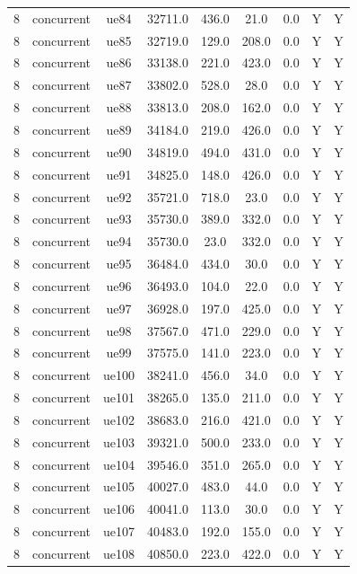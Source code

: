 \begin{table}[ht]
\begin{tabular}{|c|c|c|c|c|c|c|c|c|}
8 & concurrent & ue84 & 32711.0 & 436.0 & 21.0 & 0.0 & Y & Y \\
8 & concurrent & ue85 & 32719.0 & 129.0 & 208.0 & 0.0 & Y & Y \\
8 & concurrent & ue86 & 33138.0 & 221.0 & 423.0 & 0.0 & Y & Y \\
8 & concurrent & ue87 & 33802.0 & 528.0 & 28.0 & 0.0 & Y & Y \\
8 & concurrent & ue88 & 33813.0 & 208.0 & 162.0 & 0.0 & Y & Y \\
8 & concurrent & ue89 & 34184.0 & 219.0 & 426.0 & 0.0 & Y & Y \\
8 & concurrent & ue90 & 34819.0 & 494.0 & 431.0 & 0.0 & Y & Y \\
8 & concurrent & ue91 & 34825.0 & 148.0 & 426.0 & 0.0 & Y & Y \\
8 & concurrent & ue92 & 35721.0 & 718.0 & 23.0 & 0.0 & Y & Y \\
8 & concurrent & ue93 & 35730.0 & 389.0 & 332.0 & 0.0 & Y & Y \\
8 & concurrent & ue94 & 35730.0 & 23.0 & 332.0 & 0.0 & Y & Y \\
8 & concurrent & ue95 & 36484.0 & 434.0 & 30.0 & 0.0 & Y & Y \\
8 & concurrent & ue96 & 36493.0 & 104.0 & 22.0 & 0.0 & Y & Y \\
8 & concurrent & ue97 & 36928.0 & 197.0 & 425.0 & 0.0 & Y & Y \\
8 & concurrent & ue98 & 37567.0 & 471.0 & 229.0 & 0.0 & Y & Y \\
8 & concurrent & ue99 & 37575.0 & 141.0 & 223.0 & 0.0 & Y & Y \\
8 & concurrent & ue100 & 38241.0 & 456.0 & 34.0 & 0.0 & Y & Y \\
8 & concurrent & ue101 & 38265.0 & 135.0 & 211.0 & 0.0 & Y & Y \\
8 & concurrent & ue102 & 38683.0 & 216.0 & 421.0 & 0.0 & Y & Y \\
8 & concurrent & ue103 & 39321.0 & 500.0 & 233.0 & 0.0 & Y & Y \\
8 & concurrent & ue104 & 39546.0 & 351.0 & 265.0 & 0.0 & Y & Y \\
8 & concurrent & ue105 & 40027.0 & 483.0 & 44.0 & 0.0 & Y & Y \\
8 & concurrent & ue106 & 40041.0 & 113.0 & 30.0 & 0.0 & Y & Y \\
8 & concurrent & ue107 & 40483.0 & 192.0 & 155.0 & 0.0 & Y & Y \\
8 & concurrent & ue108 & 40850.0 & 223.0 & 422.0 & 0.0 & Y & Y \\

\end{tabular}
\end{table}
